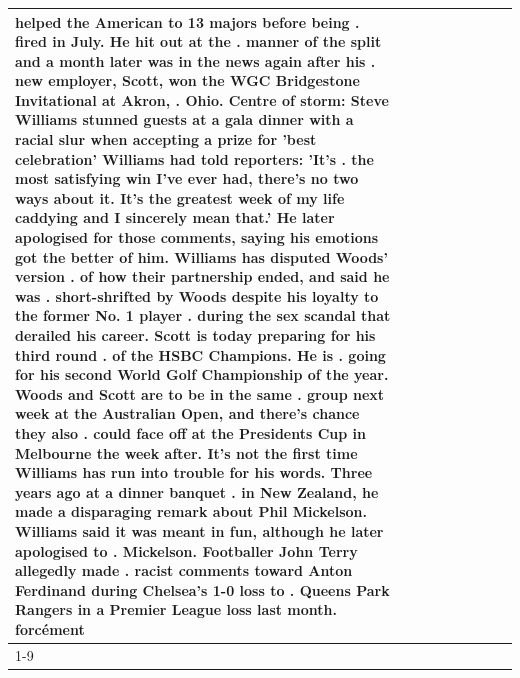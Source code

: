 \begin{table}[H]
\begin{tabular}{lllrlllll}
helped the American to 13 majors before being . fired in July. He hit out at the . manner of the split and a month later was in the news again after his . new employer, Scott, won the WGC Bridgestone Invitational at Akron, . Ohio. Centre of storm: Steve Williams stunned guests at a gala dinner with a racial slur when accepting a prize for 'best celebration' Williams had told reporters: 'It's . the most satisfying win I've ever had, there's no two ways about it. It's the greatest week of my life caddying and I sincerely mean that.' He later apologised for those comments, saying his emotions got the better of him. Williams has disputed Woods' version . of how their partnership ended, and said he was . short-shrifted by Woods despite his loyalty to the former No. 1 player . during the sex scandal that derailed his career. Scott is today preparing for his third round . of the HSBC Champions. He is . going for his second World Golf Championship of the year. Woods and Scott are to be in the same . group next week at the Australian Open, and there's chance they also . could face off at the Presidents Cup in Melbourne the week after. It's not the first time Williams has run into trouble for his words. Three years ago at a dinner banquet . in New Zealand, he made a disparaging remark about Phil Mickelson. Williams said it was meant in fun, although he later apologised to . Mickelson. Footballer John Terry allegedly made . racist comments toward Anton Ferdinand during Chelsea's 1-0 loss to . Queens Park Rangers in a Premier League loss last month. forcément \\
\cline{1-9}

\end{tabular}
\end{table}
